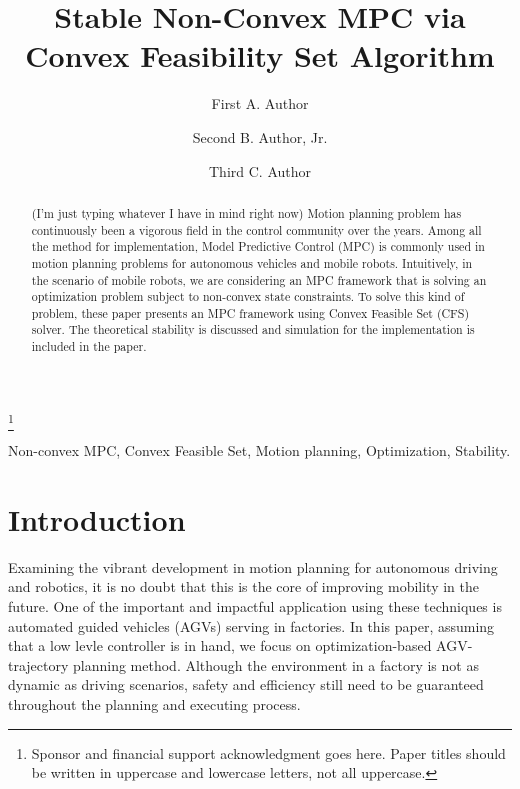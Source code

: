 \documentclass{ifacconf}
\begin{document}
\begin{frontmatter}

\title{Stable Non-Convex MPC via Convex Feasibility Set Algorithm} 

\thanks[footnoteinfo]{Sponsor and financial support acknowledgment
goes here. Paper titles should be written in uppercase and lowercase
letters, not all uppercase.}

\author[First]{First A. Author} 
\author[First]{Second B. Author, Jr.} 
\author[First]{Third C. Author}

\address[First]{National Institute of Standards and Technology, 
   Boulder, CO 80305 USA (e-mail: author@ boulder.nist.gov).}


\begin{abstract}                %
(I'm just typing whatever I have in mind right now) Motion planning problem has continuously been a vigorous field in the control community over the years. Among all the method for implementation, Model Predictive Control (MPC) is commonly used in motion planning problems for autonomous vehicles and mobile robots. Intuitively, in the scenario of mobile robots, we are considering an MPC framework that is solving an optimization problem subject to non-convex state constraints. To solve this kind of problem, these paper presents an MPC framework using Convex Feasible Set (CFS) solver. The theoretical stability is discussed and simulation for the implementation is included in the paper. 

\end{abstract}

\begin{keyword}
Non-convex MPC, Convex Feasible Set, Motion planning, Optimization, Stability.
\end{keyword}

\end{frontmatter}

\section{Introduction}
Examining the vibrant development in motion planning for autonomous driving and robotics, it is no doubt that this is the core of improving mobility in the future. One of the important and impactful application using these techniques is automated guided vehicles (AGVs) serving in factories. In this paper, assuming that a low levle controller is in hand, we focus on optimization-based AGV-trajectory planning method. Although the environment in a factory is not as dynamic as driving scenarios, safety and efficiency still need to be guaranteed throughout the planning and executing process.
\end{document}
